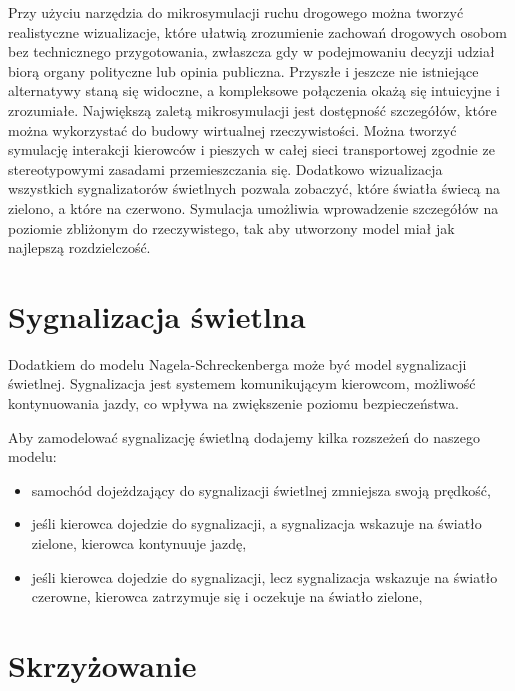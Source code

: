 \documentclass{sprawozdanie-agh}
\begin{document}
	Przy użyciu narzędzia do mikrosymulacji ruchu drogowego można tworzyć realistyczne wizualizacje, które ułatwią zrozumienie zachowań drogowych osobom bez technicznego przygotowania, zwłaszcza gdy w podejmowaniu decyzji udział biorą organy polityczne lub opinia publiczna. Przyszłe i jeszcze nie istniejące alternatywy staną się widoczne, a kompleksowe połączenia okażą się intuicyjne i zrozumiałe.
	Największą zaletą mikrosymulacji jest dostępność szczegółów, które można wykorzystać do budowy wirtualnej rzeczywistości. Można tworzyć symulację interakcji kierowców i pieszych w całej sieci transportowej zgodnie ze stereotypowymi zasadami przemieszczania się. Dodatkowo wizualizacja wszystkich sygnalizatorów świetlnych pozwala zobaczyć, które światła świecą na zielono, a które na czerwono. Symulacja umożliwia wprowadzenie szczegółów na poziomie zbliżonym do rzeczywistego, tak aby utworzony model miał jak najlepszą rozdzielczość.



	\section{Sygnalizacja świetlna}

	Dodatkiem do modelu Nagela-Schreckenberga może być model sygnalizacji świetlnej. Sygnalizacja jest systemem komunikującym kierowcom, możliwość kontynuowania jazdy, co wpływa na zwiększenie poziomu bezpieczeństwa.

	Aby zamodelować sygnalizację świetlną dodajemy kilka rozszeżeń do naszego modelu:
	\begin{itemize}
		\item samochód dojeżdzający do sygnalizacji świetlnej zmniejsza swoją prędkość,
		\item jeśli kierowca dojedzie do sygnalizacji, a sygnalizacja wskazuje na światło zielone, kierowca kontynuuje jazdę,
		\item jeśli kierowca dojedzie do sygnalizacji, lecz sygnalizacja wskazuje na światło czerowne, kierowca zatrzymuje się i oczekuje na światło zielone,
	\end{itemize}



	\section{Skrzyżowanie}
\end{document}
